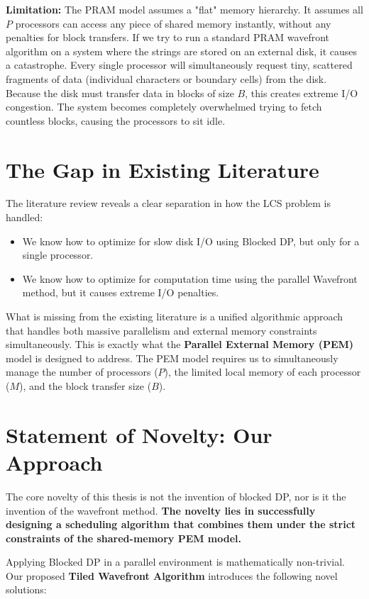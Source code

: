 \textbf{Limitation:} The PRAM model assumes a "flat" memory hierarchy. It assumes all $P$ processors can access any piece of shared memory instantly, without any penalties for block transfers. If we try to run a standard PRAM wavefront algorithm on a system where the strings are stored on an external disk, it causes a catastrophe. Every single processor will simultaneously request tiny, scattered fragments of data (individual characters or boundary cells) from the disk. Because the disk must transfer data in blocks of size $B$, this creates extreme I/O congestion. The system becomes completely overwhelmed trying to fetch countless blocks, causing the processors to sit idle.

\section{The Gap in Existing Literature}
The literature review reveals a clear separation in how the LCS problem is handled:
\begin{itemize}
    \item We know how to optimize for slow disk I/O using Blocked DP, but only for a single processor.
    \item We know how to optimize for computation time using the parallel Wavefront method, but it causes extreme I/O penalties.
\end{itemize}

What is missing from the existing literature is a unified algorithmic approach that handles both massive parallelism and external memory constraints simultaneously. This is exactly what the \textbf{Parallel External Memory (PEM)} model is designed to address. The PEM model requires us to simultaneously manage the number of processors ($P$), the limited local memory of each processor ($M$), and the block transfer size ($B$).

\section{Statement of Novelty: Our Approach}
The core novelty of this thesis is not the invention of blocked DP, nor is it the invention of the wavefront method. \textbf{The novelty lies in successfully designing a scheduling algorithm that combines them under the strict constraints of the shared-memory PEM model.} 

Applying Blocked DP in a parallel environment is mathematically non-trivial. Our proposed \textbf{Tiled Wavefront Algorithm} introduces the following novel solutions:

